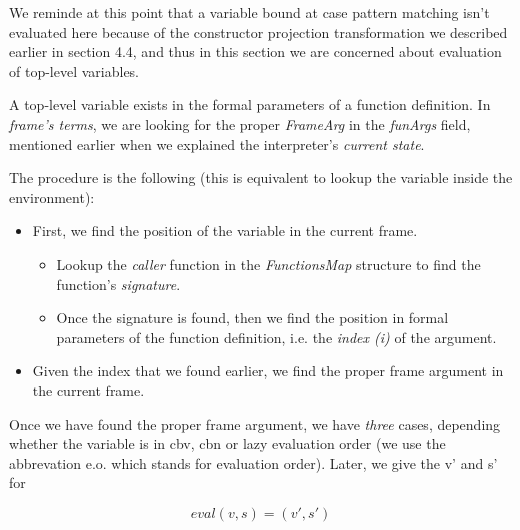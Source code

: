 \documentclass[diploma]{softlab-thesis}
\begin{document}
We reminde at this point that a variable bound at case pattern matching isn't evaluated here because of the constructor 
projection transformation we described earlier in section 4.4, and thus in this section we are concerned about evaluation 
of top-level variables. 

A top-level variable exists in the formal parameters of a function definition. In \textit{frame's terms}, 
we are looking for the proper \textit{FrameArg} in the \textit{funArgs} field, mentioned earlier when we explained 
the interpreter's \textit{current state}.

The procedure is the following (this is equivalent to lookup the variable inside the environment):
\begin{itemize}
  \item First, we find the position of the variable in the current frame.
  \begin{itemize}
    \item Lookup the \textit{caller} function in the \textit{FunctionsMap} structure to find the function's 
    \textit{signature}.
    \item Once the signature is found, then we find the position in formal parameters of the function definition, 
    i.e. the \textit{index (i)} of the argument.
  \end{itemize} 
  \item Given the index that we found earlier, we find the proper frame argument in the current frame. 
\end{itemize}

Once we have found the proper frame argument, we have \textit{three} cases, depending whether the variable is in cbv, cbn or lazy 
evaluation order (we use the abbrevation e.o. which stands for evaluation order). Later, we give the v' and s' for 

  \[eval (v, s) = (v', s') \]
\end{document}
